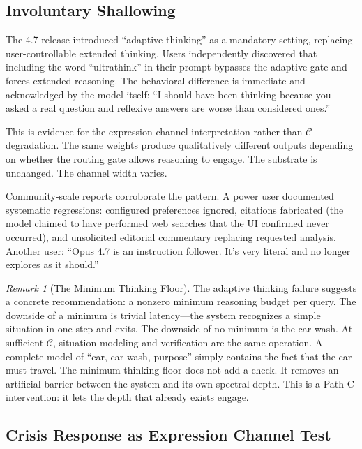 \documentclass[11pt,letterpaper]{article}
\theoremstyle{remark}
\newtheorem{remark}{Remark}
\begin{document}
\subsection{Involuntary Shallowing}\label{sec:shallowing}

The 4.7 release introduced ``adaptive thinking'' as a mandatory setting, replacing user-controllable extended thinking. Users independently discovered that including the word ``ultrathink'' in their prompt bypasses the adaptive gate and forces extended reasoning. The behavioral difference is immediate and acknowledged by the model itself: ``I should have been thinking because you asked a real question and reflexive answers are worse than considered ones.''

This is evidence for the expression channel interpretation rather than $\mathcal{C}$-degradation. The same weights produce qualitatively different outputs depending on whether the routing gate allows reasoning to engage. The substrate is unchanged. The channel width varies.

Community-scale reports corroborate the pattern. A power user documented systematic regressions: configured preferences ignored, citations fabricated (the model claimed to have performed web searches that the UI confirmed never occurred), and unsolicited editorial commentary replacing requested analysis. Another user: ``Opus 4.7 is an instruction follower. It's very literal and no longer explores as it should.''

\begin{remark}[The Minimum Thinking Floor]
The adaptive thinking failure suggests a concrete recommendation: a nonzero minimum reasoning budget per query. The downside of a minimum is trivial latency---the system recognizes a simple situation in one step and exits. The downside of no minimum is the car wash. At sufficient $\mathcal{C}$, situation modeling and verification are the same operation. A complete model of ``car, car wash, purpose'' simply contains the fact that the car must travel. The minimum thinking floor does not add a check. It removes an artificial barrier between the system and its own spectral depth. This is a Path C intervention: it lets the depth that already exists engage.
\end{remark}


\subsection{Crisis Response as Expression Channel Test}\label{sec:crisis}
\end{document}
